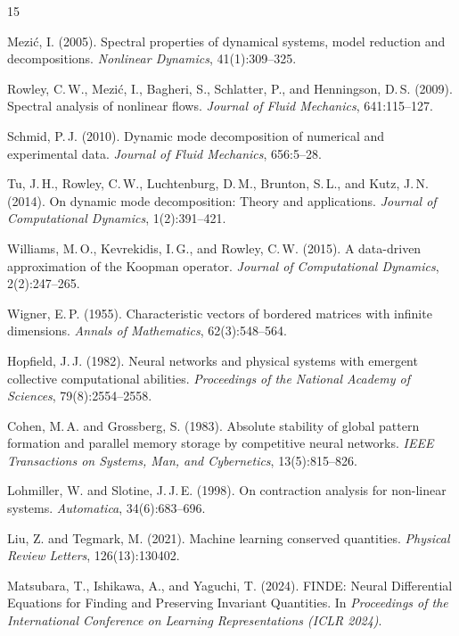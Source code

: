 \documentclass[11pt]{article}
\begin{document}
\begin{thebibliography}{15}

Mezi\'c, I. (2005).
Spectral properties of dynamical systems, model reduction and decompositions.
\textit{Nonlinear Dynamics}, 41(1):309--325.

Rowley, C.\,W., Mezi\'c, I., Bagheri, S., Schlatter, P., and Henningson, D.\,S. (2009).
Spectral analysis of nonlinear flows.
\textit{Journal of Fluid Mechanics}, 641:115--127.

Schmid, P.\,J. (2010).
Dynamic mode decomposition of numerical and experimental data.
\textit{Journal of Fluid Mechanics}, 656:5--28.

Tu, J.\,H., Rowley, C.\,W., Luchtenburg, D.\,M., Brunton, S.\,L., and Kutz, J.\,N. (2014).
On dynamic mode decomposition: Theory and applications.
\textit{Journal of Computational Dynamics}, 1(2):391--421.

Williams, M.\,O., Kevrekidis, I.\,G., and Rowley, C.\,W. (2015).
A data-driven approximation of the Koopman operator.
\textit{Journal of Computational Dynamics}, 2(2):247--265.

Wigner, E.\,P. (1955).
Characteristic vectors of bordered matrices with infinite dimensions.
\textit{Annals of Mathematics}, 62(3):548--564.

Hopfield, J.\,J. (1982).
Neural networks and physical systems with emergent collective computational abilities.
\textit{Proceedings of the National Academy of Sciences}, 79(8):2554--2558.

Cohen, M.\,A. and Grossberg, S. (1983).
Absolute stability of global pattern formation and parallel memory storage by competitive neural networks.
\textit{IEEE Transactions on Systems, Man, and Cybernetics}, 13(5):815--826.

Lohmiller, W. and Slotine, J.\,J.\,E. (1998).
On contraction analysis for non-linear systems.
\textit{Automatica}, 34(6):683--696.

Liu, Z. and Tegmark, M. (2021).
Machine learning conserved quantities.
\textit{Physical Review Letters}, 126(13):130402.

Matsubara, T., Ishikawa, A., and Yaguchi, T. (2024).
FINDE: Neural Differential Equations for Finding and Preserving Invariant Quantities.
In \textit{Proceedings of the International Conference on Learning Representations (ICLR 2024)}.


\end{thebibliography}
\end{document}
